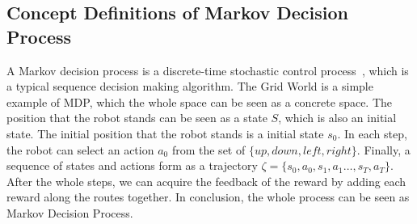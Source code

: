 \documentclass[11pt]{article}
\begin{document}


\subsection{Concept Definitions of Markov Decision Process}
A Markov decision process is a discrete-time stochastic control process~\cite{puterman1990markov}, which is a typical sequence decision making algorithm.
%
The Grid World is a simple example of MDP, which the whole space can be seen as a concrete space. The position that the robot stands can be seen as a state $S$, which is also an initial state. The initial position that the robot stands is a initial state $s_0$. In each step, the robot can select an action $a_0$ from the set of $\{up, down, left, right\}$. Finally, a sequence of states and actions form as a trajectory $\zeta = \{ s_0, a_0, s_1, a_1 \dots, s_T, a_T \}$. After the whole steps, we can acquire the feedback of the reward by adding each reward along the routes together. In conclusion, the whole process can be seen as Markov Decision Process.
\end{document}
